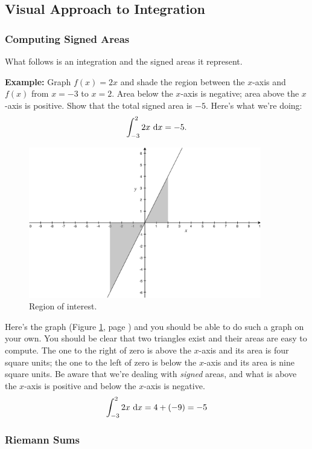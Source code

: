\documentclass[12pt,addpoints, answers, fleqn]{exam}
\begin{document}
\subsection{Visual Approach to Integration}

\subsubsection{Computing Signed Areas}

What follows is an integration and the signed areas it represent.


\textbf{Example:} Graph $f\left(x\right) = 2x$ and shade the region between the $x$-axis and $f\left(x\right)$ from $x=-3$ to $x=2$. Area below the $x$-axis is negative; area above the $x$-axis is positive. Show that the total signed area is $-5$. Here's what we're doing:
\[
\int_{-3}^{2} 2x \ {\rm{d}}x = -5.
\]

\begin{figure}[htbp] %
   \centering
   \includegraphics[width=4in]{./graphics/sa01.pdf} 
   \caption{Region of interest.}
   \label{fig:sa01}
\end{figure}
\begin{solution} Here's the graph (Figure \ref{fig:sa01}, page \pageref{fig:sa01}) and you should be able to do such a graph on your own. You should be clear that two triangles exist and their areas are easy to compute. The one to the right of zero is above the $x$-axis and its area is four square units; the one to the left of zero is below the  $x$-axis and its area is nine square units. Be aware that we're dealing with \emph{signed} areas, and what is above the $x$-axis is positive and below the $x$-axis is negative.
\[
\int_{-3}^{2} 2x \ {\rm{d}}x = 4 + \left( -9\right) = -5
\]
\end{solution}
\subsubsection{Riemann Sums}
\end{document}
